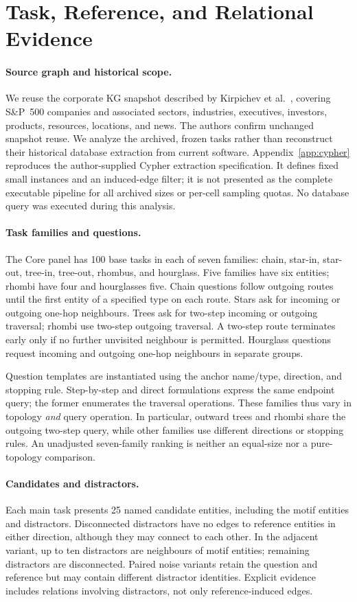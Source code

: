 \section{Task, Reference, and Relational Evidence}
\label{sec:method}
\paragraph{Source graph and historical scope.}
We reuse the corporate KG snapshot described by Kirpichev et al.~\cite{kirpichev2026towards}, covering S\&P~500 companies and associated sectors, industries, executives, investors, products, resources, locations, and news. The authors confirm unchanged snapshot reuse. We analyze the archived, frozen tasks rather than reconstruct their historical database extraction from current software. Appendix~\ref{app:cypher} reproduces the author-supplied Cypher extraction specification. It defines fixed small instances and an induced-edge filter; it is not presented as the complete executable pipeline for all archived sizes or per-cell sampling quotas. No database query was executed during this analysis.

\paragraph{Task families and questions.}
The Core panel has 100 base tasks in each of seven families: chain, star-in, star-out, tree-in, tree-out, rhombus, and hourglass. Five families have six entities; rhombi have four and hourglasses five. Chain questions follow outgoing routes until the first entity of a specified type on each route. Stars ask for incoming or outgoing one-hop neighbours. Trees ask for two-step incoming or outgoing traversal; rhombi use two-step outgoing traversal. A two-step route terminates early only if no further unvisited neighbour is permitted. Hourglass questions request incoming and outgoing one-hop neighbours in separate groups.

Question templates are instantiated using the anchor name/type, direction, and stopping rule. Step-by-step and direct formulations express the same endpoint query; the former enumerates the traversal operations. These families thus vary in topology \emph{and} query operation. In particular, outward trees and rhombi share the outgoing two-step query, while other families use different directions or stopping rules. An unadjusted seven-family ranking is neither an equal-size nor a pure-topology comparison.

\paragraph{Candidates and distractors.}
Each main task presents 25 named candidate entities, including the motif entities and distractors. Disconnected distractors have no edges to reference entities in either direction, although they may connect to each other. In the adjacent variant, up to ten distractors are neighbours of motif entities; remaining distractors are disconnected. Paired noise variants retain the question and reference but may contain different distractor identities. Explicit evidence includes relations involving distractors, not only reference-induced edges.

